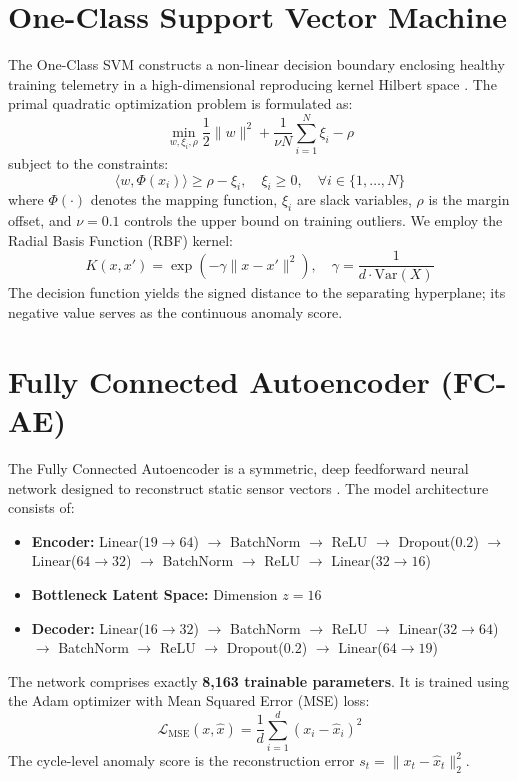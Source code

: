 \documentclass[12pt,a4paper,oneside]{report}
\begin{document}
\section{One-Class Support Vector Machine}
The One-Class SVM constructs a non-linear decision boundary enclosing healthy training telemetry in a high-dimensional reproducing kernel Hilbert space \cite{scholkopf2001estimating}. The primal quadratic optimization problem is formulated as:
\begin{equation}
    \min_{w, \xi_i, \rho} \frac{1}{2} \|w\|^2 + \frac{1}{\nu N} \sum_{i=1}^N \xi_i - \rho
\end{equation}
subject to the constraints:
\begin{equation}
    \langle w, \Phi(x_i) \rangle \ge \rho - \xi_i, \quad \xi_i \ge 0, \quad \forall i \in \{1, \dots, N\}
\end{equation}
where $\Phi(\cdot)$ denotes the mapping function, $\xi_i$ are slack variables, $\rho$ is the margin offset, and $\nu = 0.1$ controls the upper bound on training outliers. We employ the Radial Basis Function (RBF) kernel:
\begin{equation}
    K(x, x') = \exp(-\gamma \|x - x'\|^2), \quad \gamma = \frac{1}{d \cdot \text{Var}(X)}
\end{equation}
The decision function yields the signed distance to the separating hyperplane; its negative value serves as the continuous anomaly score.

\section{Fully Connected Autoencoder (FC-AE)}
The Fully Connected Autoencoder is a symmetric, deep feedforward neural network designed to reconstruct static sensor vectors \cite{zhou2017anomaly}. The model architecture consists of:
\begin{itemize}
    \item \textbf{Encoder:} Linear($19 \rightarrow 64$) $\rightarrow$ BatchNorm $\rightarrow$ ReLU $\rightarrow$ Dropout($0.2$) $\rightarrow$ Linear($64 \rightarrow 32$) $\rightarrow$ BatchNorm $\rightarrow$ ReLU $\rightarrow$ Linear($32 \rightarrow 16$)
    \item \textbf{Bottleneck Latent Space:} Dimension $z = 16$
    \item \textbf{Decoder:} Linear($16 \rightarrow 32$) $\rightarrow$ BatchNorm $\rightarrow$ ReLU $\rightarrow$ Linear($32 \rightarrow 64$) $\rightarrow$ BatchNorm $\rightarrow$ ReLU $\rightarrow$ Dropout($0.2$) $\rightarrow$ Linear($64 \rightarrow 19$)
\end{itemize}
The network comprises exactly \textbf{8,163 trainable parameters}. It is trained using the Adam optimizer with Mean Squared Error (MSE) loss:
\begin{equation}
    \mathcal{L}_{\text{MSE}}(x, \hat{x}) = \frac{1}{d} \sum_{i=1}^d (x_i - \hat{x}_i)^2
\end{equation}
The cycle-level anomaly score is the reconstruction error $s_t = \|x_t - \hat{x}_t\|_2^2$.
\end{document}
